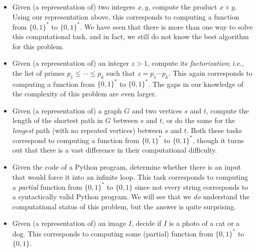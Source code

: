 \begin{itemize}
\item
  Given (a representation of) two integers \(x,y\), compute the product
  \(x\times y\). Using our representation above, this corresponds to
  computing a function from \(\{0,1\}^*\) to \(\{0,1\}^*\). We have seen
  that there is more than one way to solve this computational task, and
  in fact, we still do not know the best algorithm for this problem.
\item
  Given (a representation of) an integer \(z>1\), compute its
  \emph{factorization}; i.e., the list of primes
  \(p_1 \leq \cdots \leq p_k\) such that \(z = p_1\cdots p_k\). This
  again corresponds to computing a function from \(\{0,1\}^*\) to
  \(\{0,1\}^*\). The gaps in our knowledge of the complexity of this
  problem are even larger.
\item
  Given (a representation of) a graph \(G\) and two vertices \(s\) and
  \(t\), compute the length of the shortest path in \(G\) between \(s\)
  and \(t\), or do the same for the \emph{longest} path (with no
  repeated vertices) between \(s\) and \(t\). Both these tasks
  correspond to computing a function from \(\{0,1\}^*\) to
  \(\{0,1\}^*\), though it turns out that there is a vast difference in
  their computational difficulty.
\item
  Given the code of a Python program, determine whether there is an
  input that would force it into an infinite loop. This task corresponds
  to computing a \emph{partial} function from \(\{0,1\}^*\) to
  \(\{0,1\}\) since not every string corresponds to a syntactically
  valid Python program. We will see that we \emph{do} understand the
  computational status of this problem, but the answer is quite
  surprising.
\item
  Given (a representation of) an image \(I\), decide if \(I\) is a photo
  of a cat or a dog. This corresponds to computing some (partial)
  function from \(\{0,1\}^*\) to \(\{0,1\}\).
\end{itemize}

\hypertarget{booleanrem}{}


